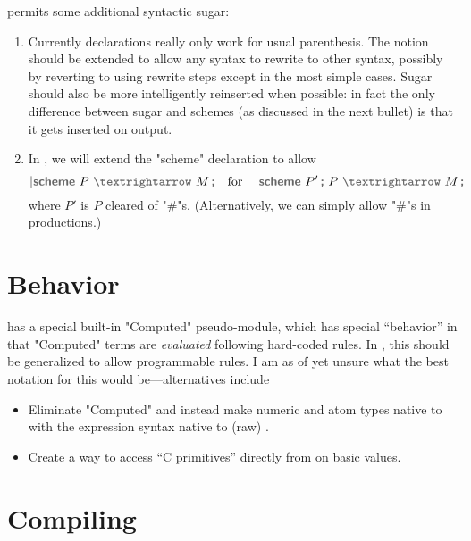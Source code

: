 \documentclass[11pt]{article} %
\begin{document}
 permits some additional syntactic sugar:
\begin{enumerate}

\item Currently  declarations really only work for usual parenthesis. The notion should be
  extended to allow any syntax to rewrite to other syntax, possibly by reverting to using rewrite
  steps except in the most simple cases. Sugar should also be more intelligently reinserted when
  possible: in fact the only difference between sugar and schemes (as discussed in the next bullet)
  is that it gets inserted on output.

\item In , we will extend the "scheme" declaration to allow
  \begin{displaymath}
    \kw{|scheme}~P~\kw{$→$}~M\,\kw;  \quad\text{for}\quad
    \kw{|scheme}~P'\,\kw; ~ P~\kw{$→$}~M\,\kw;
  \end{displaymath}
  where $P'$ is $P$ cleared of "#"s. (Alternatively, we can simply allow "#"s in productions.)

\end{enumerate}


\section{Behavior}\label{sec:behavior}

 has a special built-in "Computed" pseudo-module, which has special ``behavior'' in that
"Computed" terms are \emph{evaluated} following hard-coded rules. In , this should be
generalized to allow programmable rules.  I am as of yet unsure what the best notation for this
would be---alternatives include
\begin{itemize}

\item Eliminate "Computed" and instead make numeric and atom types native to \HAX with the
  expression syntax native to (raw) \HAX.

\item Create a way to access ``C primitives'' directly from \HAX on basic values.

\end{itemize}


\section{Compiling}\label{sec:compiling}
\end{document}

